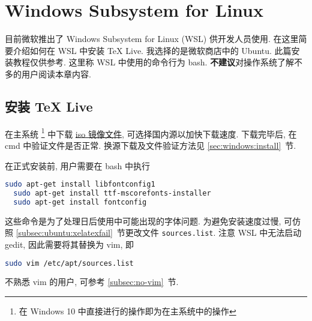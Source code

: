 
\chapter{Windows Subsystem for Linux}

目前微软推出了 Windows Subsystem for Linux (WSL) 供开发人员使用.
在这里简要介绍如何在 WSL 中安装 \TeX{} Live.
我选择的是微软商店中的 Ubuntu.
此篇安装教程仅供参考.
这里称 WSL 中使用的命令行为 \textsf{bash}.
\textbf{不建议}对操作系统了解不多的用户阅读本章内容.

\section{安装 \TeX{} Live}

在主系统%
\footnote{在 Windows 10 中直接进行的操作即为在主系统中的操作}%
中下载
\href{https://mirrors.ctan.org/systems/texlive/Images/texlive2019.iso}{iso 镜像文件},
可选择国内源以加快下载速度.
下载完毕后, 在 \textsf{cmd} 中验证文件是否正常.
换源下载及文件验证方法见 \ref{sec:windows:install}~节.

在正式安装前,
用户需要在 \textsf{bash} 中执行
\begin{lstlisting}[language=bash]
  sudo apt-get install libfontconfig1
  sudo apt-get install ttf-mscorefonts-installer
  sudo apt-get install fontconfig
\end{lstlisting}
这些命令是为了处理日后使用中可能出现的字体问题.
为避免安装速度过慢,
可仿照 \ref{subsec:ubuntu:xelatexfail}~节更改文件 \texttt{sources.list}.
注意 WSL 中无法启动 \textsf{gedit},
因此需要将其替换为 \textsf{vim},
即
\begin{lstlisting}[language=bash]
  sudo vim /etc/apt/sources.list
\end{lstlisting}
不熟悉 \textsf{vim} 的用户,
可参考 \ref{subsec:no-vim}~节.

